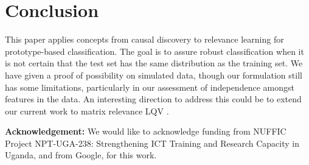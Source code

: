 \documentclass{esannV2}
\begin{document}
\section{Conclusion}
\label{sec:Conclusion}

This paper applies concepts from causal discovery to relevance learning for prototype-based classification. The goal is to assure robust classification when it is not certain that the test set has the same distribution as the training set.
We have given a proof of possibility on simulated data, though our formulation still has some limitations, particularly in our assessment of independence amongst features in the data. An interesting direction to address this could be to extend our current work to matrix relevance LQV \cite{09}.

\textbf{Acknowledgement:} We would like to acknowledge funding from NUFFIC Project NPT-UGA-238: Strengthening ICT Training and Research Capacity in Uganda, and from Google, for this work.


\begin{footnotesize}




\end{footnotesize}

\end{document}

